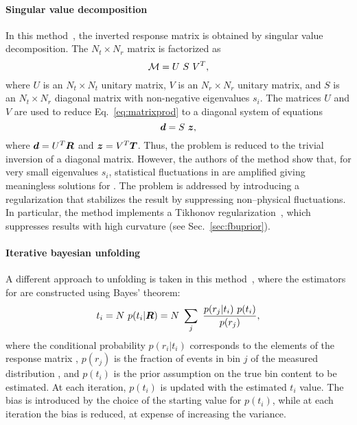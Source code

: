 \paragraph{Singular value decomposition}
In this method~\cite{Hocker:1995kb}, the inverted response matrix is
obtained by singular value decomposition. The $N_t\times N_r$ matrix
\TrasfMatrix{} is factorized as 
\begin{equation}
\mathcal{M}{} = U~S~V^T,
\end{equation}
where $U$ is an $N_t\times N_t$ unitary matrix, $V$ is an $N_r\times
N_r$ unitary matrix, and $S$ is an $N_t\times N_r$ diagonal matrix
with non-negative eigenvalues $s_i$.
The matrices $U$ and $V$ are used to reduce Eq.~\ref{eq:matrixprod}
to a diagonal system of equations
\begin{equation}
\label{eq:matrixprod}
\boldsymbol{d} = S~\boldsymbol{z},
\end{equation}
where $\boldsymbol{d}=U^T\boldsymbol{R}{}$ and $\boldsymbol{z}=V^T\boldsymbol{T}{}$. Thus, the
problem is reduced to the trivial inversion of a diagonal matrix.
However, the authors of the method show that, for very small
eigenvalues $s_i$, statistical fluctuations in \Reco{} are amplified giving
meaningless solutions for \Truth{}. The problem is addressed by
introducing a regularization that stabilizes the result by suppressing
non--physical fluctuations. In particular, the method implements a
Tikhonov regularization~\cite{Tikhonov1943stability}, which suppresses
results with high curvature (see Sec.~\ref{sec:fbuprior}).
\paragraph{Iterative bayesian unfolding}
A different approach to unfolding is taken in this
method~\cite{dagostini1995NIMPA}, where the estimators for \Truth{}
are constructed using Bayes' theorem:
\begin{equation}
t_i = N~p(t_i|\boldsymbol{R}{}) = N~\sum_j~\frac{p(r_j|t_i)~p(t_i)}{p(r_j)},
\end{equation} 
where the conditional probability $p(r_i|t_i)$ corresponds to the
elements of the response matrix \TrasfMatrix{}, $p(r_j)$ is the
fraction of events in bin $j$ of the measured distribution \Reco{},
and $p(t_i)$ is the prior assumption on the true bin content to be
estimated. At each iteration, $p(t_i)$ is updated with the estimated
$t_i$ value. The bias is introduced by the choice of the starting
value for $p(t_i)$, while at each iteration the bias is reduced, at
expense of increasing the variance.

